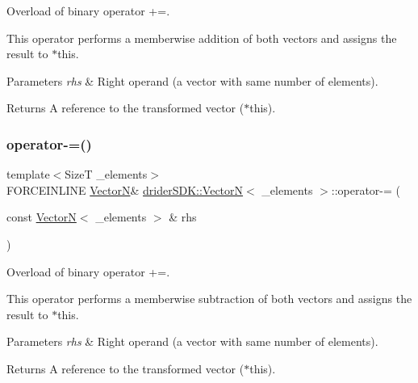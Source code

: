 Overload of binary operator +=.

This operator performs a memberwise addition of both vectors and assigns the result to $\ast$this.


\begin{DoxyParams}{Parameters}
{\em rhs} & Right operand (a vector with same number of elements).\\
\hline
\end{DoxyParams}
\begin{DoxyReturn}{Returns}
A reference to the transformed vector ($\ast$this). 
\end{DoxyReturn}
\mbox{\label{classdrider_s_d_k_1_1_vector_n_afa5153ab687f62e42974889f9f3b4b16}} 
\subsubsection{\texorpdfstring{operator-\/=()}{operator-=()}}
{\footnotesize\ttfamily template$<$SizeT \+\_\+elements$>$ \\
F\+O\+R\+C\+E\+I\+N\+L\+I\+NE \hyperlink{classdrider_s_d_k_1_1_vector_n}{VectorN}\& \hyperlink{classdrider_s_d_k_1_1_vector_n}{drider\+S\+D\+K\+::\+VectorN}$<$ \+\_\+elements $>$\+::operator-\/= (\begin{DoxyParamCaption}\item[{const \hyperlink{classdrider_s_d_k_1_1_vector_n}{VectorN}$<$ \+\_\+elements $>$ \&}]{rhs }\end{DoxyParamCaption})\hspace{0.3cm}{\ttfamily [inline]}}

Overload of binary operator +=.

This operator performs a memberwise subtraction of both vectors and assigns the result to $\ast$this.


\begin{DoxyParams}{Parameters}
{\em rhs} & Right operand (a vector with same number of elements).\\
\hline
\end{DoxyParams}
\begin{DoxyReturn}{Returns}
A reference to the transformed vector ($\ast$this). 
\end{DoxyReturn}
\mbox{\label{classdrider_s_d_k_1_1_vector_n_accaaea8ae68ab302ab373087d453535e}} 
